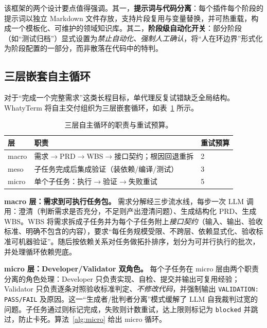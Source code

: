 该框架的两个设计要点值得强调。其一，\textbf{提示词与代码分离}：每个插件每个阶段的提示词以独立 Markdown 文件存放，支持片段复用与变量替换，并可热重载，构成一个模板化、可维护的领域知识库。其二，\textbf{阶段级自动化开关}：部分阶段（如“测试归档”）显式设置为\emph{禁止自动化、强制人工确认}，将“人在环边界”形式化为阶段配置的一部分，而非散落在代码中的特判。

\subsection{三层嵌套自主循环}
\label{sec:method-loop}

对于“完成一个完整需求”这类长程目标，单代理反复试错缺乏全局结构。WhatyTerm 将自主交付组织为三层嵌套循环，如表~\ref{tab:threelayer} 所示。

\begin{table}[t]
  \centering
  \small
  \caption{三层自主循环的职责与重试预算。}
  \label{tab:threelayer}
  \begin{tabular}{@{}lll@{}}
    \toprule
    层 & 职责 & 重试预算 \\
    \midrule
    macro & 需求$\to$PRD$\to$WBS$\to$接口契约；根因回退重拆 & 2 \\
    meso  & 子任务完成后集成验证（装依赖/编译/测试） & 3 \\
    micro & 单个子任务：执行$\to$验证$\to$失败重试 & 5 \\
    \bottomrule
  \end{tabular}
\end{table}

\textbf{macro 层：需求到可执行任务包。} 需求分解经三步流水线，每步一次 LLM 调用：澄清（判断需求是否充分，不足则产出澄清问题）、生成结构化 PRD、生成 WBS。WBS 将需求拆成子任务并为每个子任务附上\emph{接口契约}（输入、输出、验收标准、明确不包含的内容），要求“每任务规模受限、不跨层、依赖显式化、验收标准可机器验证”。随后按依赖关系对任务做拓扑排序，划分为可并行执行的批次，并处理循环依赖兜底。

\textbf{micro 层：Developer/Validator 双角色。} 每个子任务在 micro 层由两个职责分离的角色处理：Developer 只负责实现、自检、提交并输出可复用经验；Validator 只负责逐条对照验收标准判定、\emph{不修改代码}，并强制输出 \texttt{VALIDATION: PASS/FAIL} 及原因。这一“生成者/批判者分离”模式缓解了 LLM 自我裁判过宽的问题。子任务通过则标记完成，失败则计数重试，达上限则标记为 \texttt{blocked} 并跳过，防止卡死。算法~\ref{alg:micro} 给出 micro 循环。

\begin{algorithm}[t]
  \small
  \DontPrintSemicolon
  \caption{micro 层子任务循环}
  \label{alg:micro}
\end{algorithm}

